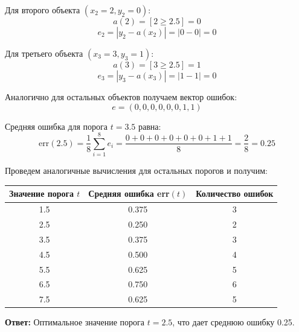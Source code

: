 Для второго объекта $(x_2 = 2, y_2 = 0)$:
$$a(2) = [2 \geq 2.5] = 0$$
$$e_2 = |y_2 - a(x_2)| = |0 - 0| = 0$$

Для третьего объекта $(x_3 = 3, y_3 = 1)$:
$$a(3) = [3 \geq 2.5] = 1$$
$$e_3 = |y_3 - a(x_3)| = |1 - 1| = 0$$

Аналогично для остальных объектов получаем вектор ошибок:
$$e = (0, 0, 0, 0, 0, 0, 1, 1)$$

Средняя ошибка для порога $t = 3.5$ равна:
$$\text{err}(2.5) = \frac{1}{8}\sum_{i=1}^8 e_i = \frac{0 + 0 + 0 + 0 + 0 + 0 + 1 + 1}{8} = \frac{2}{8} = 0.25$$

Проведем аналогичные вычисления для остальных порогов и получим:

\begin{center}
    \begin{tabular}{|c|c|c|}
        \hline
        Значение порога $t$ & Средняя ошибка err$(t)$ & Количество ошибок \\
        \hline
        1.5                 & 0.375                   & 3                 \\
        2.5                 & 0.250                   & 2                 \\
        3.5                 & 0.375                   & 3                 \\
        4.5                 & 0.500                   & 4                 \\
        5.5                 & 0.625                   & 5                 \\
        6.5                 & 0.750                   & 6                 \\
        7.5                 & 0.625                   & 5                 \\
        \hline
    \end{tabular}
\end{center}

\textbf{Ответ:} Оптимальное значение порога $t = 2.5$, что дает среднюю ошибку 0.25.

